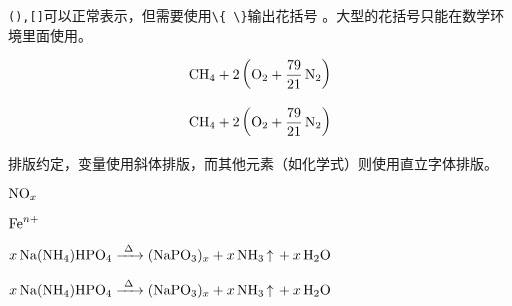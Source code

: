 
\begin{codeshow}
\par
{}\par
{}\par
{}
\end{codeshow}


\lstinline|(),[]|可以正常表示，但需要使用\lstinline|\{ \}|输出花括号 。大型的花括号只能在数学环境里面使用。

\begin{codeshow}
\par
{}
\end{codeshow}

\begin{latex}
\[\ce{CH4 + 2 $\left( \ce{O2 + 79/21 N2} \right)$}\]
\end{latex}

\[\ce{CH4 + 2 $\left( \ce{O2 + 79/21 N2} \right)$}\]


\begin{codeshow}
\par
{}\par
{}
\end{codeshow}


\begin{codeshow}
\par
{}
\end{codeshow}

排版约定，变量使用斜体排版，而其他元素（如化学式）则使用直立字体排版。

\begin{codeshow}
$\ce{NO_x}$\par
$\ce{Fe^n+}$
\end{codeshow}

\begin{latex}
$\ce{x Na(NH4)HPO4 ->[\Delta] (NaPO3)_x + x NH3 ^ + x H2O}$
\end{latex}

\begin{center}
    $\ce{x Na(NH4)HPO4 ->[\Delta] (NaPO3)_x + x NH3 ^ + x H2O}$
\end{center}

\begin{codeshow}
\par
\ce{[Pt(\eta^2-C2H4)Cl3]-}
\end{codeshow}

